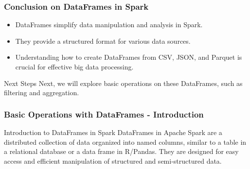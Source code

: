 \documentclass[aspectratio=169]{beamer}
\begin{document}
\begin{frame}
    \frametitle{Conclusion on DataFrames in Spark}
    \begin{itemize}
        \item DataFrames simplify data manipulation and analysis in Spark.
        \item They provide a structured format for various data sources.
        \item Understanding how to create DataFrames from CSV, JSON, and Parquet is crucial for effective big data processing.
    \end{itemize}
    \begin{block}{Next Steps}
        Next, we will explore basic operations on these DataFrames, such as filtering and aggregation.
    \end{block}
\end{frame}

\begin{frame}[fragile]
    \frametitle{Basic Operations with DataFrames - Introduction}
    \begin{block}{Introduction to DataFrames in Spark}
        DataFrames in Apache Spark are a distributed collection of 
        data organized into named columns, similar to a table in a 
        relational database or a data frame in R/Pandas. They are 
        designed for easy access and efficient manipulation of structured 
        and semi-structured data.
    \end{block}
\end{frame}
\end{document}
